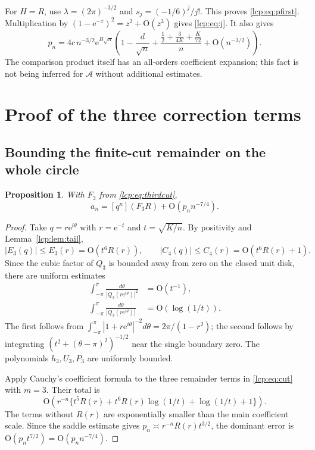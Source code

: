 \documentclass[11pt]{article}
\numberwithin{equation}{section}
\newtheorem{proposition}[theorem]{Proposition}
\theoremstyle{definition}\newtheorem{definition}[theorem]{Definition}
\theoremstyle{remark}\newtheorem{remark}[theorem]{Remark}
\newcommand{\OO}{\mathrm O}
\newcommand{\Acal}{\mathcal A}
\newcommand{\ee}{\mathrm e}
\begin{document}
For $H=R$, use $\lambda=(2\pi)^{-3/2}$ and $s_j=(-1/6)^j/j!$.
This proves \eqref{lcp:eq:pfirst}. Multiplication by
$(1-\ee^{-z})^2=z^2+\OO(z^3)$ gives \eqref{lcp:eq:j}.
It also gives
\begin{equation}\label{lcp:eq:pe2}
 p_n=4c\,n^{-3/2}\ee^{B\sqrt n}
 \left(1-\frac d{\sqrt n}
 +\frac{\frac12+\frac{3}{4K}+\frac K{72}}{n}
 +\OO(n^{-3/2})\right).
\end{equation}
The comparison product itself has an all-orders coefficient expansion;
this fact is not being inferred for $\Acal$ without additional estimates.

\section{Proof of the three correction terms}
\subsection{Bounding the finite-cut remainder on the whole circle}
\begin{proposition}\label{lcp:prop:approxerror}
With $F_3$ from \eqref{lcp:eq:thirdcut},
\begin{equation}\label{lcp:eq:approxerror}
 a_n=[q^n](F_3R)+\OO(p_n n^{-7/4}).
\end{equation}
\end{proposition}
\begin{proof}
Take $q=r\ee^{i\theta}$ with $r=\ee^{-t}$ and $t=\sqrt{K/n}$.
By positivity and Lemma~\ref{lcp:lem:tail},
\[
 |E_3(q)|\le E_3(r)=\OO(t^6R(r)),\qquad
 |C_4(q)|\le C_4(r)=\OO(t^6R(r)+1).
\]
Since the cubic factor of $Q_3$ is bounded away from zero on the closed
unit disk, there are uniform estimates
\begin{align*}
 \int_{-\pi}^{\pi}\frac{d\theta}{|Q_3(r\ee^{i\theta})|^2}
     &=\OO(t^{-1}),\\
 \int_{-\pi}^{\pi}\frac{d\theta}{|Q_3(r\ee^{i\theta})|}
     &=\OO(\log(1/t)).
\end{align*}
The first follows from
$\int_{-\pi}^{\pi}|1+r\ee^{i\theta}|^{-2}d\theta
=2\pi/(1-r^2)$; the second follows by integrating
$(t^2+(\theta-\pi)^2)^{-1/2}$ near the single boundary zero.
The polynomials $h_3,U_3,P_3$ are uniformly bounded.

Apply Cauchy's coefficient formula to the three remainder terms in
\eqref{lcp:eq:cut} with $m=3$. Their total is
\[
 \OO\!\left(r^{-n}
     \{t^5R(r)+t^6R(r)\log(1/t)+\log(1/t)+1\}\right).
\]
The terms without $R(r)$ are exponentially smaller than the main
coefficient scale. Since the saddle estimate gives
$p_n\asymp r^{-n}R(r)t^{3/2}$, the dominant error is
$\OO(p_nt^{7/2})=\OO(p_nn^{-7/4})$.
\end{proof}
\end{document}
